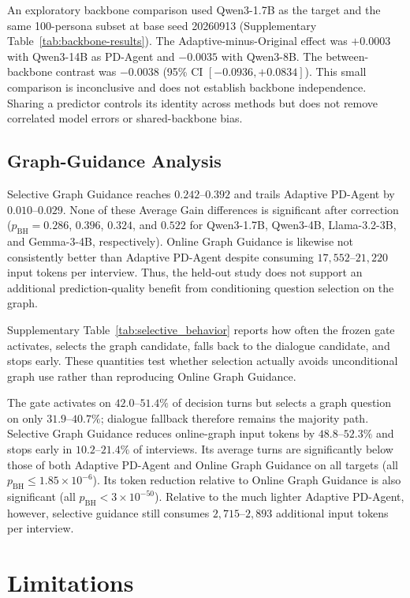 \documentclass{ieeeaccess}
\begin{document}
An exploratory backbone comparison used Qwen3-1.7B as the target and the same
100-persona subset at base seed 20260913 (Supplementary Table~\ref{tab:backbone-results}).
The Adaptive-minus-Original effect was $+0.0003$ with Qwen3-14B as PD-Agent and
$-0.0035$ with Qwen3-8B. The between-backbone contrast was $-0.0038$
(95\% CI $[-0.0936,+0.0834]$). This small comparison is inconclusive and does not
establish backbone independence. Sharing a predictor controls its identity across
methods but does not remove correlated model errors or shared-backbone bias.

\subsection{Graph-Guidance Analysis}

Selective Graph Guidance reaches $0.242$--$0.392$ and trails Adaptive PD-Agent by
$0.010$--$0.029$. None of these Average Gain differences is significant after correction
($p_{\mathrm{BH}}=0.286$, $0.396$, $0.324$, and $0.522$ for Qwen3-1.7B, Qwen3-4B,
Llama-3.2-3B, and Gemma-3-4B, respectively). Online Graph Guidance is likewise not
consistently better than Adaptive PD-Agent despite consuming $17{,}552$--$21{,}220$ input
tokens per interview. Thus, the held-out study does not support an additional
prediction-quality benefit from conditioning question selection on the graph.

Supplementary Table~\ref{tab:selective_behavior} reports how often the frozen gate activates, selects the graph
candidate, falls back to the dialogue candidate, and stops early. These quantities test
whether selection actually avoids unconditional graph use rather than reproducing Online
Graph Guidance.

The gate activates on $42.0$--$51.4\%$ of decision turns but selects a graph question on only
$31.9$--$40.7\%$; dialogue fallback therefore remains the majority path. Selective Graph
Guidance reduces online-graph input tokens by $48.8$--$52.3\%$ and stops early in
$10.2$--$21.4\%$ of interviews. Its average turns are significantly below those of both Adaptive PD-Agent and Online
Graph Guidance on all targets (all $p_{\mathrm{BH}}\le1.85\times10^{-6}$). Its token
reduction relative to Online Graph Guidance is also significant
(all $p_{\mathrm{BH}}<3\times10^{-50}$). Relative to the much
lighter Adaptive PD-Agent, however, selective guidance still consumes $2{,}715$--$2{,}893$
additional input tokens per interview.
\section{Limitations}
\end{document}
